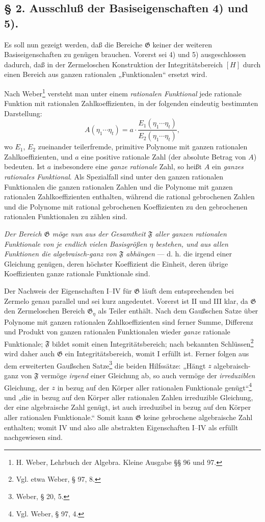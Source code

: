 \documentclass[11pt]{article}
\begin{document}
\subsection*{§ 2. Ausschluß der Basiseigenschaften 4) und 5).}

Es soll nun gezeigt werden, daß die Bereiche $\mathfrak G$ keiner der weiteren
Basiseigenschaften zu genügen brauchen. Vorerst sei 4) und 5) ausgeschlossen
dadurch, daß in der Zermeloschen Konstruktion der Integritätsbereich $[H]$ durch
einen Bereich aus ganzen rationalen „Funktionalen“ ersetzt wird.

Nach Weber\footnote{H. Weber, Lehrbuch der Algebra. Kleine Ausgabe §§ 96 und
97.} versteht man unter einem \emph{rationalen Funktional} jede rationale
Funktion mit rationalen Zahlkoeffizienten, in der folgenden eindeutig bestimmten
Darstellung:
\[
 A(\eta_1\cdots \eta_t)
   = a\cdot\frac{E_1(\eta_1\cdots \eta_t)}{E_2(\eta_1\cdots \eta_t)},
\]
wo $E_1$, $E_2$ zueinander teilerfremde, primitive Polynome mit ganzen
rationalen Zahlkoeffizienten, und $a$ eine positive rationale Zahl (der absolute
Betrag von $A$) bedeuten. Ist $a$ insbesondere eine \emph{ganze rationale} Zahl,
so heißt $A$ ein \emph{ganzes rationales Funktional}. Als Spezialfall sind unter
den ganzen rationalen Funktionalen die ganzen rationalen Zahlen und die Polynome
mit ganzen rationalen Zahlkoeffizienten enthalten, während die rational
gebrochenen Zahlen und die Polynome mit rational gebrochenen Koeffizienten zu
den gebrochenen rationalen Funktionalen zu zählen sind.

\emph{Der Bereich $\mathfrak G$ möge nun aus der Gesamtheit $\mathfrak F$ aller
ganzen rationalen Funktionale von je endlich vielen Basisgrößen $\eta$ bestehen,
und aus allen Funktionen die algebraisch-ganz von $\mathfrak F$ abhängen} ---
d. h. die irgend einer Gleichung genügen, deren höchster Koeffizient die Einheit,
deren übrige Koeffizienten ganze rationale Funktionale sind.

Der Nachweis der Eigenschaften I--IV für $\mathfrak G$ läuft dem entsprechenden
bei Zermelo genau parallel und sei kurz angedeutet. Vorerst ist II und III klar,
da $\mathfrak G$ den Zermeloschen Bereich $\mathfrak G_\eta$ als Teiler
enthält. Nach dem Gaußschen Satze über Polynome mit ganzen rationalen
Zahlkoeffizienten sind ferner Summe, Differenz und Produkt von ganzen rationalen
Funktionalen wieder \emph{ganze} rationale Funktionale; $\mathfrak F$ bildet
somit einen Integritätsbereich; nach bekannten Schlüssen\footnote{Vgl. etwa
Weber, § 97, 8.} wird daher auch $\mathfrak G$ ein Integritätsbereich, womit I
erfüllt ist. Ferner folgen aus dem erweiterten Gaußschen Satze\footnote{Weber,
§ 20, 5.} die beiden Hilfssätze: „Hängt $z$ algebraisch-ganz von $\mathfrak F$
vermöge \emph{irgend} einer Gleichung ab, so auch vermöge der
\emph{irreduziblen} Gleichung, der $z$ in bezug auf den Körper aller rationalen
Funktionale genügt“\footnote{Vgl. Weber, § 97, 4.} und „die in bezug auf den
Körper aller rationalen Zahlen irreduzible Gleichung, der eine algebraische Zahl
genügt, ist auch irreduzibel in bezug auf den Körper aller rationalen
Funktionale.“ Somit kann $\mathfrak G$ keine gebrochene algebraische Zahl
enthalten; womit IV und also alle abstrakten Eigenschaften I--IV als erfüllt
nachgewiesen sind.
\end{document}
